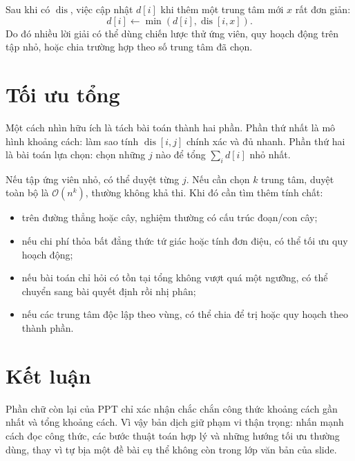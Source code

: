\documentclass[11pt]{article}
\newcommand{\Oh}{\mathcal{O}}
\begin{document}
Sau khi có \(\operatorname{dis}\), việc cập nhật \(d[i]\) khi thêm một trung
tâm mới \(x\) rất đơn giản:
\[
  d[i]\leftarrow \min(d[i],\operatorname{dis}[i,x]).
\]
Do đó nhiều lời giải có thể dùng chiến lược thử ứng viên, quy hoạch động trên
tập nhỏ, hoặc chia trường hợp theo số trung tâm đã chọn.

\section{Tối ưu tổng}

Một cách nhìn hữu ích là tách bài toán thành hai phần. Phần thứ nhất là mô
hình khoảng cách: làm sao tính \(\operatorname{dis}[i,j]\) chính xác và đủ
nhanh. Phần thứ hai là bài toán lựa chọn: chọn những \(j\) nào để tổng
\(\sum_i d[i]\) nhỏ nhất.

Nếu tập ứng viên nhỏ, có thể duyệt từng \(j\). Nếu cần chọn \(k\) trung tâm,
duyệt toàn bộ là \(\Oh(n^k)\), thường không khả thi. Khi đó cần tìm thêm tính
chất:
\begin{itemize}
  \item trên đường thẳng hoặc cây, nghiệm thường có cấu trúc đoạn/con cây;
  \item nếu chi phí thỏa bất đẳng thức tứ giác hoặc tính đơn điệu, có thể tối
  ưu quy hoạch động;
  \item nếu bài toán chỉ hỏi có tồn tại tổng không vượt quá một ngưỡng, có thể
  chuyển sang bài quyết định rồi nhị phân;
  \item nếu các trung tâm độc lập theo vùng, có thể chia để trị hoặc quy hoạch
  theo thành phần.
\end{itemize}

\section{Kết luận}

Phần chữ còn lại của PPT chỉ xác nhận chắc chắn công thức khoảng cách gần nhất
và tổng khoảng cách. Vì vậy bản dịch giữ phạm vi thận trọng: nhấn mạnh cách
đọc công thức, các bước thuật toán hợp lý và những hướng tối ưu thường dùng,
thay vì tự bịa một đề bài cụ thể không còn trong lớp văn bản của slide.
\end{document}

